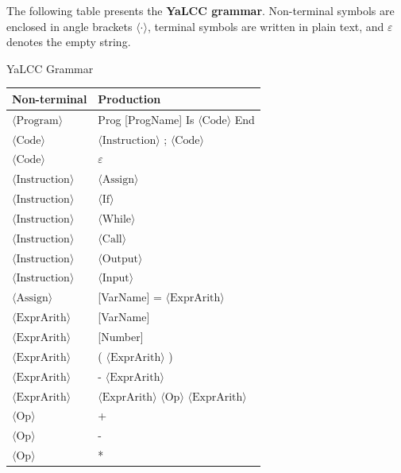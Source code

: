 \documentclass{article}
\begin{document}
\noindent
The following table presents the \textbf{YaLCC grammar}. Non-terminal symbols are enclosed in angle brackets $\langle\cdot\rangle$, terminal symbols are written in plain text, and $\varepsilon$ denotes the empty string. \\

\begin{resultbox}{YaLCC Grammar}
\renewcommand{\arraystretch}{1.5}
\setlength{\tabcolsep}{8pt}
\begin{tabularx}{\linewidth}{|l|X|}
\hline
\textbf{Non-terminal} & \textbf{Production} \\
\hline
$\langle\text{Program}\rangle$ & Prog [ProgName] Is $\langle\text{Code}\rangle$ End \\
\hline
$\langle\text{Code}\rangle$ & $\langle\text{Instruction}\rangle$ ; $\langle\text{Code}\rangle$ \\
\hline
$\langle\text{Code}\rangle$ & $\varepsilon$ \\
\hline
$\langle\text{Instruction}\rangle$ & $\langle\text{Assign}\rangle$ \\
\hline
$\langle\text{Instruction}\rangle$ & $\langle\text{If}\rangle$ \\
\hline
$\langle\text{Instruction}\rangle$ & $\langle\text{While}\rangle$ \\
\hline
$\langle\text{Instruction}\rangle$ & $\langle\text{Call}\rangle$ \\
\hline
$\langle\text{Instruction}\rangle$ & $\langle\text{Output}\rangle$ \\
\hline
$\langle\text{Instruction}\rangle$ & $\langle\text{Input}\rangle$ \\
\hline
$\langle\text{Assign}\rangle$ & [VarName] = $\langle\text{ExprArith}\rangle$ \\
\hline
$\langle\text{ExprArith}\rangle$ & [VarName] \\
\hline
$\langle\text{ExprArith}\rangle$ & [Number] \\
\hline
$\langle\text{ExprArith}\rangle$ & ( $\langle\text{ExprArith}\rangle$ ) \\
\hline
$\langle\text{ExprArith}\rangle$ & - $\langle\text{ExprArith}\rangle$ \\
\hline
$\langle\text{ExprArith}\rangle$ & $\langle\text{ExprArith}\rangle$ $\langle\text{Op}\rangle$ $\langle\text{ExprArith}\rangle$ \\
\hline
$\langle\text{Op}\rangle$ & + \\
\hline
$\langle\text{Op}\rangle$ & - \\
\hline
$\langle\text{Op}\rangle$ & * \\

\end{tabularx}
\end{resultbox}
\end{document}
